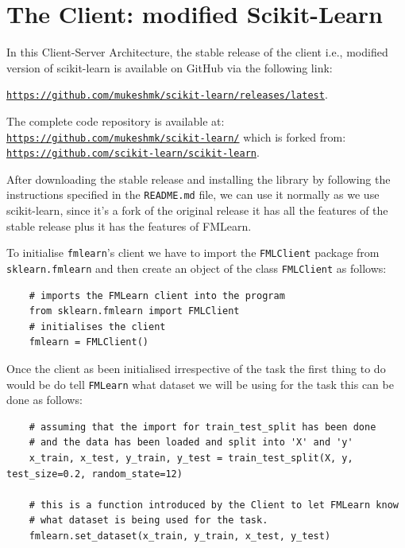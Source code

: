 \section{The Client: modified Scikit-Learn}
\label{scikit-learn}

In this Client-Server Architecture, the stable release of the client i.e., modified version of scikit-learn is available on GitHub via the following link:
\begin{center}
\href{https://github.com/mukeshmk/scikit-learn/releases/latest}
{\texttt{https://github.com/mukeshmk/scikit-learn/releases/latest}}.
\end{center}

The complete code repository is available at: \href{https://github.com/mukeshmk/scikit-learn/}{\texttt{https://github.com/mukeshmk/scikit-learn/}} \newline which is forked from: \href{https://github.com/scikit-learn/scikit-learn}{\texttt{https://github.com/scikit-learn/scikit-learn}}.

After downloading the stable release and installing the library by following the instructions specified in the \texttt{README.md} file, we can use it normally as we use scikit-learn, since it's a fork of the original release it has all the features of the stable release plus it has the features of FMLearn.

To initialise \texttt{fmlearn}'s client we have to import the \texttt{FMLClient} package from \texttt{sklearn.fmlearn} and then create an object of the class \texttt{FMLClient} as follows:
\begin{lstlisting}
    # imports the FMLearn client into the program
    from sklearn.fmlearn import FMLClient
    # initialises the client
    fmlearn = FMLClient()
\end{lstlisting}

Once the client as been initialised irrespective of the task the first thing to do would be do tell \texttt{FMLearn} what dataset we will be using for the task this can be done as follows:

\begin{lstlisting}
    # assuming that the import for train_test_split has been done
    # and the data has been loaded and split into 'X' and 'y'
    x_train, x_test, y_train, y_test = train_test_split(X, y, test_size=0.2, random_state=12)

    # this is a function introduced by the Client to let FMLearn know 
    # what dataset is being used for the task.
    fmlearn.set_dataset(x_train, y_train, x_test, y_test)
\end{lstlisting}

